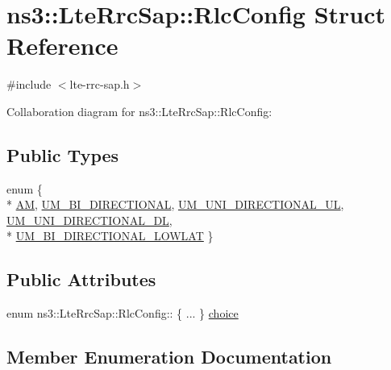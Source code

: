 \hypertarget{structns3_1_1LteRrcSap_1_1RlcConfig}{}\section{ns3\+:\+:Lte\+Rrc\+Sap\+:\+:Rlc\+Config Struct Reference}
\label{structns3_1_1LteRrcSap_1_1RlcConfig}


{\ttfamily \#include $<$lte-\/rrc-\/sap.\+h$>$}



Collaboration diagram for ns3\+:\+:Lte\+Rrc\+Sap\+:\+:Rlc\+Config\+:
\subsection*{Public Types}
\begin{DoxyCompactItemize}
\item 
enum \{ \\*
\hyperlink{structns3_1_1LteRrcSap_1_1RlcConfig_ab6ab94ca4abaf717926f31db4dddc61baac722b7609a143367fc24a94f8e4f6c7}{AM}, 
\hyperlink{structns3_1_1LteRrcSap_1_1RlcConfig_ab6ab94ca4abaf717926f31db4dddc61ba55368feac1627138969235809e6eedc5}{U\+M\+\_\+\+B\+I\+\_\+\+D\+I\+R\+E\+C\+T\+I\+O\+N\+AL}, 
\hyperlink{structns3_1_1LteRrcSap_1_1RlcConfig_ab6ab94ca4abaf717926f31db4dddc61ba590c05a82e744bfb87986d444da6f4e8}{U\+M\+\_\+\+U\+N\+I\+\_\+\+D\+I\+R\+E\+C\+T\+I\+O\+N\+A\+L\+\_\+\+UL}, 
\hyperlink{structns3_1_1LteRrcSap_1_1RlcConfig_ab6ab94ca4abaf717926f31db4dddc61ba5d389f5f1231591496fe6e143e8f1ddf}{U\+M\+\_\+\+U\+N\+I\+\_\+\+D\+I\+R\+E\+C\+T\+I\+O\+N\+A\+L\+\_\+\+DL}, 
\\*
\hyperlink{structns3_1_1LteRrcSap_1_1RlcConfig_ab6ab94ca4abaf717926f31db4dddc61bae193e49db4401a2b88cfc0f3d782f9d8}{U\+M\+\_\+\+B\+I\+\_\+\+D\+I\+R\+E\+C\+T\+I\+O\+N\+A\+L\+\_\+\+L\+O\+W\+L\+AT}
 \}
\end{DoxyCompactItemize}
\subsection*{Public Attributes}
\begin{DoxyCompactItemize}
\item 
enum ns3\+::\+Lte\+Rrc\+Sap\+::\+Rlc\+Config\+:: \{ ... \}  \hyperlink{structns3_1_1LteRrcSap_1_1RlcConfig_a9c8978e8bd86b61b3ce6209569f38245}{choice}
\end{DoxyCompactItemize}


\subsection{Member Enumeration Documentation}
